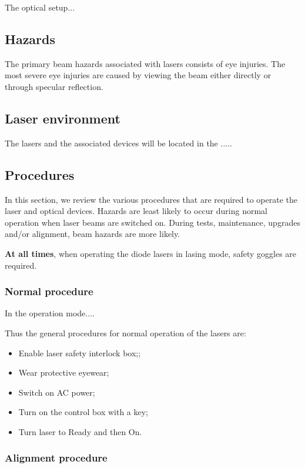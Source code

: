 The optical setup...

\subsection{Hazards}

The primary beam hazards associated with lasers consists of eye 
injuries. The most severe eye injuries are caused by viewing the beam either directly
or through specular reflection. 

\subsection{Laser environment}

The lasers and the associated devices will be located in the .....
\subsection{Procedures}

In this section, we review the various procedures that are required to operate the
laser and optical devices. Hazards are least likely to occur during normal operation
when laser beams are switched on. During tests, maintenance,
upgrades and/or alignment,  beam hazards are more likely.

{\bf At all times}, when operating the diode lasers in lasing mode, safety goggles
are required.

\subsubsection{Normal procedure}
In the operation mode....

Thus the general procedures for normal operation of the lasers are:

\begin {itemize}
\item Enable laser safety interlock box;;
\item Wear protective eyewear;
\item Switch on AC power;
\item Turn on the control box with a key; 
\item Turn laser to Ready and then On.
\end {itemize}

\subsubsection{Alignment procedure}

